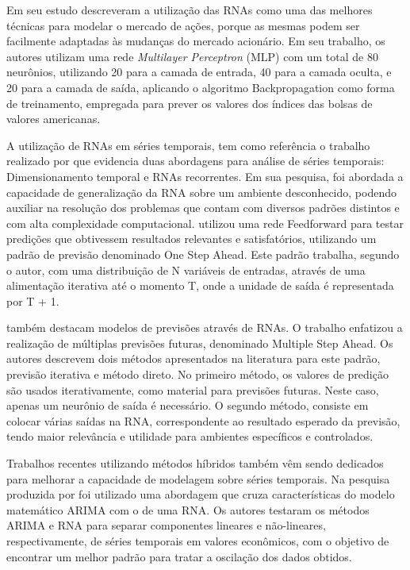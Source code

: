 Em seu estudo  descreveram a utilização das RNAs como uma das melhores técnicas para modelar o mercado de ações, porque as mesmas podem ser facilmente adaptadas às mudanças do mercado acionário. Em seu trabalho, os autores utilizam uma rede \textit{Multilayer Perceptron} (MLP) com um total de 80 neurônios, utilizando 20 para a camada de entrada, 40 para a camada oculta, e 20 para a camada de saída, aplicando o algoritmo Backpropagation como forma de treinamento, empregada para prever os valores dos índices das bolsas de valores americanas.

A utilização de RNAs em séries temporais, tem como referência o trabalho realizado por  que evidencia duas abordagens para análise de séries temporais: Dimensionamento temporal e RNAs recorrentes. Em sua pesquisa, foi abordada a capacidade de generalização da RNA sobre um ambiente desconhecido, podendo auxiliar na resolução dos problemas que contam com diversos padrões distintos e com alta complexidade computacional.  utilizou uma rede Feedforward para testar predições que obtivessem resultados relevantes e satisfatórios, utilizando um padrão de previsão denominado One Step Ahead. Este padrão trabalha, segundo o autor, com uma distribuição de  N variáveis de entradas, através de uma alimentação iterativa até o momento T, onde a unidade de saída é representada por T + 1.

 também destacam modelos de previsões através de RNAs. O trabalho enfatizou a realização de múltiplas previsões futuras, denominado Multiple Step Ahead. Os autores descrevem dois métodos apresentados na literatura para  este padrão, previsão iterativa e método direto. No primeiro método, os  valores de predição são usados iterativamente, como material para previsões futuras. Neste caso, apenas um neurônio de saída é necessário. O segundo método, consiste em colocar várias saídas na RNA, correspondente ao resultado esperado da previsão, tendo maior  relevância e utilidade  para ambientes específicos e controlados.

Trabalhos recentes utilizando métodos híbridos também vêm sendo dedicados para melhorar a capacidade de modelagem sobre séries temporais. Na pesquisa produzida por  foi utilizado uma abordagem que cruza características do modelo matemático ARIMA com o de uma RNA. Os autores testaram os métodos ARIMA e RNA para separar componentes lineares e não-lineares, respectivamente, de séries temporais em valores econômicos, com o objetivo de encontrar um melhor padrão para tratar a oscilação dos dados obtidos.


